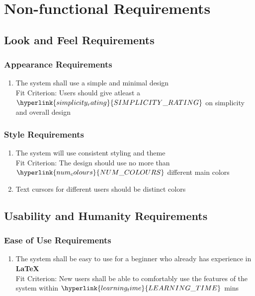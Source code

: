 \documentclass[12pt, titlepage]{article}
\begin{document}
	\section{Non-functional Requirements}
	
	\subsection{Look and Feel Requirements}
	\subsubsection{Appearance Requirements}
	\begin{enumerate}[{NFR}1.]
		\item The system shall use a simple and minimal design\\
		{\color{red}Fit Criterion: Users should give atleast a $\hyperlink{simplicity_rating}{SIMPLICITY\_RATING}$ on simplicity and overall design}
	\end{enumerate}
	\subsubsection{Style Requirements}
	\begin{enumerate}[resume*]
		\item The system will use consistent styling and theme\\
		{\color{red}Fit Criterion: The design should use no more than $\hyperlink{num_colours}{NUM\_COLOURS}$ different main colors}
		\item Text cursors for different users should be distinct colors
	\end{enumerate}
	\subsection{Usability and Humanity Requirements}
	\subsubsection{Ease of Use Requirements}
	\begin{enumerate}[resume*]
		\item The system shall be easy to use for a beginner who already has experience in \textbf{LaTeX}\\
		{\color{red}Fit Criterion: New users shall be able to comfortably use the features of the system within $\hyperlink{learning_time}{LEARNING\_TIME}$  mins}
	\end{enumerate}
\end{document}
